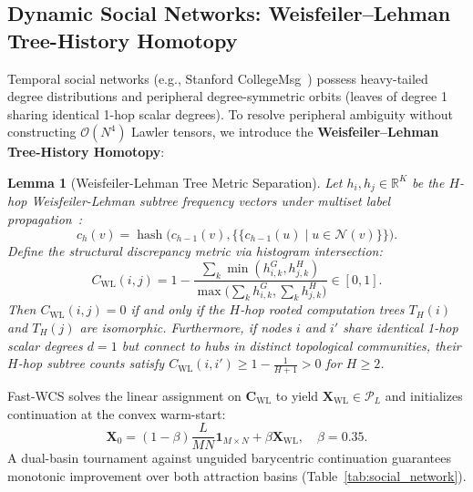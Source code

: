 \documentclass[conference]{IEEEtran}
\newtheorem{lemma}{Lemma}
\begin{document}
\subsection{Dynamic Social Networks: Weisfeiler--Lehman Tree-History Homotopy}
\label{subsec:domain_social}

Temporal social networks (e.g., Stanford CollegeMsg~\cite{panzarasa2009}) possess heavy-tailed degree distributions and peripheral degree-symmetric orbits (leaves of degree 1 sharing identical 1-hop scalar degrees). To resolve peripheral ambiguity without constructing $\mathcal{O}(N^4)$ Lawler tensors, we introduce the \textbf{Weisfeiler--Lehman Tree-History Homotopy}:

\begin{lemma}[Weisfeiler-Lehman Tree Metric Separation]
\label{lem:wl}
Let $h_i, h_j \in \mathbb{R}^K$ be the $H$-hop Weisfeiler-Lehman subtree frequency vectors under multiset label propagation~\cite{shervashidze2011weisfeiler, kriege2016valid}:
\begin{equation}
c_h(v) = \operatorname{hash}\Big( c_{h-1}(v), \big\{\!\!\{ c_{h-1}(u) \mid u \in \mathcal{N}(v) \}\!\!\big\} \Big).
\label{eq:wl_relabeling}
\end{equation}
Define the structural discrepancy metric via histogram intersection:
\begin{equation}
C_{\text{WL}}(i, j) = 1 - \frac{\sum_{k} \min(h_{i, k}^G, h_{j, k}^H)}{\max\big(\sum_k h_{i, k}^G, \sum_k h_{j, k}^H\big)} \in [0, 1].
\label{eq:cwl_metric}
\end{equation}
Then $C_{\text{WL}}(i, j) = 0$ if and only if the $H$-hop rooted computation trees $T_H(i)$ and $T_H(j)$ are isomorphic. Furthermore, if nodes $i$ and $i'$ share identical 1-hop scalar degrees $d=1$ but connect to hubs in distinct topological communities, their $H$-hop subtree counts satisfy $C_{\text{WL}}(i, i') \geq 1 - \frac{1}{H+1} > 0$ for $H \geq 2$.
\end{lemma}

Fast-WCS solves the linear assignment on $\mathbf{C}_{\text{WL}}$ to yield $\mathbf{X}_{\text{WL}} \in \mathcal{P}_L$ and initializes continuation at the convex warm-start:
\begin{equation}
\mathbf{X}_0 = (1 - \beta) \frac{L}{MN}\mathbf{1}_{M \times N} + \beta \mathbf{X}_{\text{WL}}, \quad \beta = 0.35.
\label{eq:social_warmstart}
\end{equation}
A dual-basin tournament against unguided barycentric continuation guarantees monotonic improvement over both attraction basins (Table~\ref{tab:social_network}).
\end{document}
